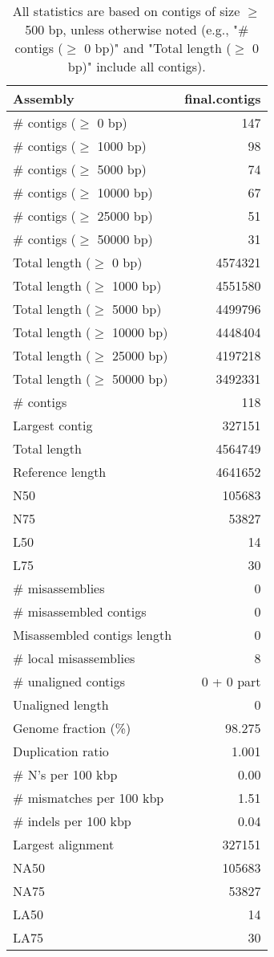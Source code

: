 \documentclass[12pt,a4paper]{article}
\begin{document}
\begin{table}[ht]
\begin{center}
\caption{All statistics are based on contigs of size $\geq$ 500 bp, unless otherwise noted (e.g., "\# contigs ($\geq$ 0 bp)" and "Total length ($\geq$ 0 bp)" include all contigs).}
\begin{tabular}{|l*{1}{|r}|}
\hline
Assembly & final.contigs \\ \hline
\# contigs ($\geq$ 0 bp) & 147 \\ \hline
\# contigs ($\geq$ 1000 bp) & 98 \\ \hline
\# contigs ($\geq$ 5000 bp) & 74 \\ \hline
\# contigs ($\geq$ 10000 bp) & 67 \\ \hline
\# contigs ($\geq$ 25000 bp) & 51 \\ \hline
\# contigs ($\geq$ 50000 bp) & 31 \\ \hline
Total length ($\geq$ 0 bp) & 4574321 \\ \hline
Total length ($\geq$ 1000 bp) & 4551580 \\ \hline
Total length ($\geq$ 5000 bp) & 4499796 \\ \hline
Total length ($\geq$ 10000 bp) & 4448404 \\ \hline
Total length ($\geq$ 25000 bp) & 4197218 \\ \hline
Total length ($\geq$ 50000 bp) & 3492331 \\ \hline
\# contigs & 118 \\ \hline
Largest contig & 327151 \\ \hline
Total length & 4564749 \\ \hline
Reference length & 4641652 \\ \hline
N50 & 105683 \\ \hline
N75 & 53827 \\ \hline
L50 & 14 \\ \hline
L75 & 30 \\ \hline
\# misassemblies & 0 \\ \hline
\# misassembled contigs & 0 \\ \hline
Misassembled contigs length & 0 \\ \hline
\# local misassemblies & 8 \\ \hline
\# unaligned contigs & 0 + 0 part \\ \hline
Unaligned length & 0 \\ \hline
Genome fraction (\%) & 98.275 \\ \hline
Duplication ratio & 1.001 \\ \hline
\# N's per 100 kbp & 0.00 \\ \hline
\# mismatches per 100 kbp & 1.51 \\ \hline
\# indels per 100 kbp & 0.04 \\ \hline
Largest alignment & 327151 \\ \hline
NA50 & 105683 \\ \hline
NA75 & 53827 \\ \hline
LA50 & 14 \\ \hline
LA75 & 30 \\ \hline
\end{tabular}
\end{center}
\end{table}
\end{document}
